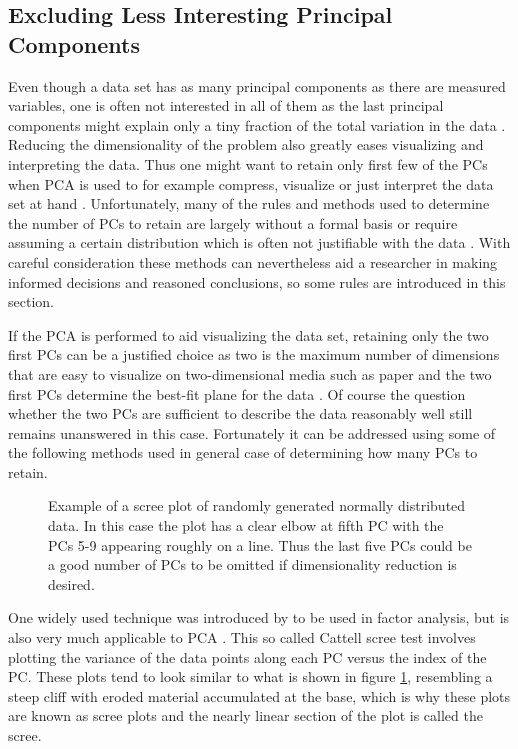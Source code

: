 \documentclass[english, oneside]{HYgradu}
\begin{document}
\subsection{Excluding Less Interesting Principal Components}
\reversemarginpar
{}
Even though a data set has as many principal components as there are measured variables, one is often not interested in all of them as the last principal components might explain only a tiny fraction of the total variation in the data \citep{james2013introduction}. Reducing the dimensionality of the problem also greatly eases visualizing and interpreting the data. Thus one might want to retain only first few of the PCs when PCA is used to for example compress, visualize or just interpret the data set at hand \citep{james2013introduction, johnson2007applied}. Unfortunately, many of the rules and methods used to determine the number of PCs to retain are largely without a formal basis or require assuming a certain distribution which is often not justifiable with the data \citep{jolliffe2002principal}. With careful consideration these methods can nevertheless aid a researcher in making informed decisions and reasoned conclusions, so some rules are introduced in this section.

If the PCA is performed to aid visualizing the data set, retaining only the two first PCs can be a justified choice as two is the maximum number of dimensions that are easy to visualize on two-dimensional media such as paper and the two first PCs determine the best-fit plane for the data \citep{jolliffe2002principal}. Of course the question whether the two PCs are sufficient to describe the data reasonably well still remains unanswered in this case. Fortunately it can be addressed using some of the following methods used in general case of determining how many PCs to retain.

\begin{figure}
    \centering
    
    \caption{Example of a scree plot of randomly generated normally distributed data. In this case the plot has a clear elbow at fifth PC with the PCs 5-9 appearing roughly on a line. Thus the last five PCs could be a good number of PCs to be omitted if dimensionality reduction is desired.}\label{fig:scree}
\end{figure}

One widely used technique was introduced by \citet{cattell1966scree} to be used in factor analysis, but is also very much applicable to PCA \citep{jolliffe2002principal}. This so called Cattell scree test involves plotting the variance of the data points along each PC versus the index of the PC. These plots tend to look similar to what is shown in figure \ref{fig:scree}, resembling a steep cliff with eroded material accumulated at the base, which is why these plots are known as scree plots and the nearly linear section of the plot is called the scree.
\end{document}
